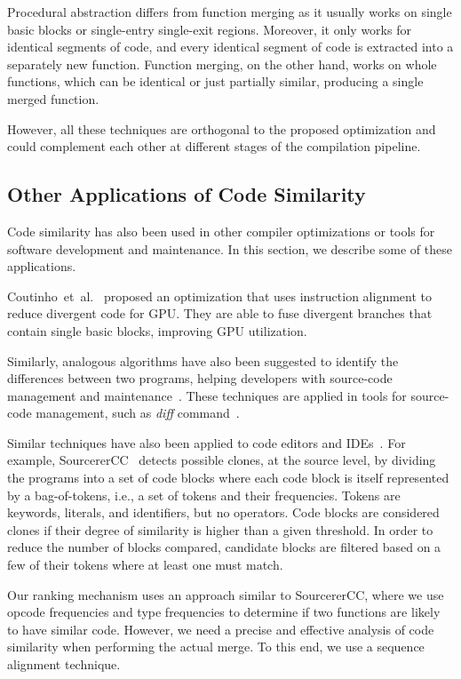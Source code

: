 Procedural abstraction differs from function merging as it usually works on
single basic blocks or single-entry single-exit regions.
Moreover, it only works for identical segments of code, and every identical
segment of code is extracted into a separately new function.
Function merging, on the other hand, works on whole functions, which can be
identical or just partially similar, producing a single merged function.

However, all these techniques are orthogonal to the proposed optimization and
could complement each other at different stages of the compilation pipeline.

\subsection{Other Applications of Code Similarity}

Code similarity has also been used in other compiler optimizations or tools for
software development and maintenance.
In this section, we describe some of these applications.

Coutinho~et~al.~\cite{coutinho11} proposed an optimization that uses instruction
alignment to reduce divergent code for GPU.
They are able to fuse divergent branches that contain single basic blocks,
improving GPU utilization.

Similarly, analogous algorithms have also been suggested to identify the
differences between two programs, helping developers with source-code
management and maintenance~\cite{yang91,miller85}.
These techniques are applied in tools for source-code management, such as
\textit{diff} command~\cite{miller85}.

Similar techniques have also been applied to code editors and IDEs~\cite{toomim04,sajnani16}.
For example,
SourcererCC~\cite{sajnani16} detects possible clones, at the source level, by
dividing the programs into a set of code blocks where each code block is itself
represented by a bag-of-tokens, i.e., a set of tokens and their frequencies.
Tokens are keywords, literals, and identifiers, but no operators.
Code blocks are considered clones if their degree of similarity is higher than
a given threshold.
In order to reduce the number of blocks compared, candidate blocks are filtered
based on a few of their tokens where at least one must match.

Our ranking mechanism uses an approach similar to SourcererCC, where we use
opcode frequencies and type frequencies to determine if two functions are
likely to have similar code.
However, we need a precise and effective analysis of code similarity when
performing the actual merge.
To this end, we use a sequence alignment technique.

